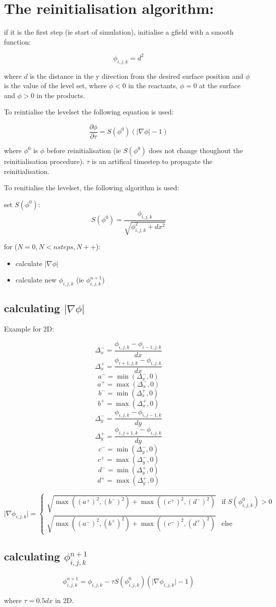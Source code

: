 \documentclass[12pt]{report}
\begin{document}
\section*{The reinitialisation algorithm:}

if it is the first step (ie start of simulation),  initialise a gfield with a smooth function:

\[\phi_{i,j,k} = d^2 \]

where $d$ is the distance in the y direction from the desired surface position and $\phi$ is the value of the level set, where $\phi < 0$ in the reactants, $\phi = 0$ at the surface and $\phi > 0$ in the products.

To reintialise the levelset the following equation is used:

\[ \frac{\partial \phi}{\partial \tau} = S (\phi^0) (\lvert \nabla \phi \rvert - 1)  \]

where $\phi^0$ is $\phi$ before reinitialisation (ie $S(\phi^0)$ does not change thoughout the reinitialisation procedure). $\tau$ is an artifical timestep to propagate the reinitialisation.

To renitialise the levelset, the following algorithm is used:

set $S(\phi^0)$:
\[S(\phi^0) = \frac{\phi_{i,j,k}}{\sqrt{{\phi_{i,j,k}^2 + dx^2}}} \]

for ($N=0, N<nsteps, N++$):
\begin{itemize}
\item calculate $\lvert \nabla \phi \rvert$
\item calculate new $\phi_{i,j,k}$ (ie $\phi^{n+1}_{i,j,k}$)
\end{itemize}


\subsection*{calculating $\lvert \nabla \phi \rvert$}
Example for 2D:

\[\Delta^-_x = \frac{\phi_{i,j,k} - \phi_{i-1,j,k}}{dx}  \]
\[\Delta^+_x = \frac{\phi_{i+1,j,k} - \phi_{i,j,k}}{dx}  \]
\[a^- = \min(\Delta^-_x,0)  \]
\[a^+ = \max(\Delta^-_x,0)  \]
\[b^- = \min(\Delta^+_x,0)  \]
\[b^+ = \max(\Delta^+_x,0)  \]
\[\Delta^-_y = \frac{\phi_{i,j,k} - \phi_{i,j-1,k}}{dy}  \]
\[\Delta^+_y = \frac{\phi_{i,j+1,k} - \phi_{i,j,k}}{dy}  \]
\[c^- = \min(\Delta^-_y,0)  \]
\[c^+ = \max(\Delta^-_y,0)  \]
\[d^- = \min(\Delta^+_y,0)  \]
\[d^+ = \max(\Delta^+_y,0)  \]

\[ \lvert \nabla \phi_{i,j,k} \rvert =
\begin{cases}
  \sqrt{\max((a^+)^2,(b^-)^2) + \max((c^+)^2,(d^-)^2)} & \text{if } S(\phi^0_{i,j,k}) > 0 \\
  \sqrt{\max((a^-)^2,(b^+)^2) + \max((c^-)^2,(d^+)^2)} & \text{else}
\end{cases}
\]

\subsection*{calculating $\phi^{n+1}_{i,j,k}$}

\[ \phi^{n+1}_{i,j,k} = \phi_{i,j,k} - \tau S(\phi^0_{i,j,k}) (\lvert \nabla \phi_{i,j,k} \rvert - 1) \]

where $\tau = 0.5 dx$ in 2D.
\end{document}
